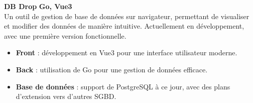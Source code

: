 \documentclass[a4paper,10pt]{article}
\begin{document}
\begin{paracol}{2}
\begin{flushleft}
  \textbf{DB Drop} \hfill \textbf{Go, Vue3} \\
  Un outil de gestion de base de données sur navigateur, permettant de visualiser et modifier des données de manière intuitive.
  Actuellement en développement, avec une première version fonctionnelle.
  \begin{itemize}[left=0pt,label={--},nosep]
    \item \textbf{Front} : développement en Vue3 pour une interface utilisateur moderne.
    \item \textbf{Back} : utilisation de Go pour une gestion de données efficace.
    \item \textbf{Base de données} : support de PostgreSQL à ce jour, avec des plans d'extension vers d'autres SGBD.
  \end{itemize}
  \vspace{1em}

  \end{flushleft}
  
\end{paracol}
\end{document}
